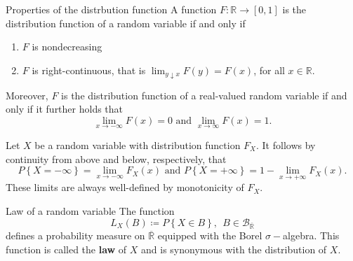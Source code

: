 \begin{thrm}{Properties of the distrbution function}{}
A function \( F:\mathbb{R} \to [0,1] \) is the distribution function of a random variable if and only if 
\begin{enumerate}[label = \emph{\roman*.)}]
    \item \( F \) is nondecreasing
    \item \( F \) is right-continuous, that is \( \lim_{y \downarrow x} F(y) = F(x) \), for all \( x \in \mathbb{R}  \).  
\end{enumerate}
Moreover, \( F \) is the distribution function of a real-valued random variable if and only if it further holds that 
\[
    \lim_{x \to - \infty }F(x) = 0  \text{ and } \lim_{x \to \infty} F(x) = 1.
\]
\end{thrm}



\begin{rmk}{}{}
Let \(X\) be a random variable with distribution function \(F_{X} \). It follows by continuity from above and below, respectively, that 
\[
    P\left\{ X = - \infty  \right\} = \lim_{x \to - \infty } F_{X} (x) \text{ and } P \left\{ X = + \infty  \right\} = 1 - \lim_{x \to + \infty } F_{X} (x). 
\]
These limits are always well-defined by monotonicity of \(F_{X} \). 
\end{rmk}

\begin{defn}{Law of a random variable}{}
The function 
\[
    L_{X} (B)\coloneqq P\left\{ X \in B \right\}, \ \ B \in \mathcal{B} _{\overline{\mathbb{R} } }
\]
defines a probability measure on \(\overline{\mathbb{R} } \) equipped with the Borel \(\sigma -\)algebra. This function is called the \textbf{law } of \(X\) and is synonymous with the distribution of \(X\). 
\end{defn}

